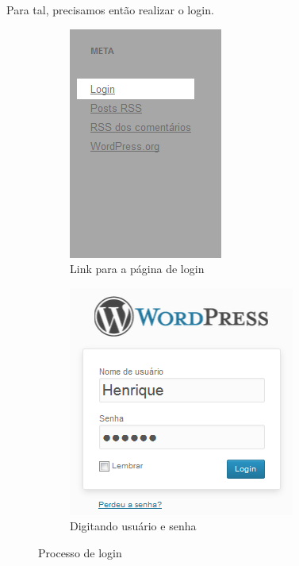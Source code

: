 \documentclass[12pt,onecolumn]{article}
\begin{document}
		Para tal, precisamos então realizar o login.
		\begin{figure}[H]
			\begin{subfigure}{.4\textwidth}
				\centering
				\includegraphics{login1.png}
				\caption{Link para a página de login}
			\end{subfigure}
			\begin{subfigure}{.4\textwidth}
				\centering
				\includegraphics{login2.png}
				\caption{Digitando usuário e senha}
			\end{subfigure}
			\caption{Processo de login}
		\end{figure}
	
\end{document}
